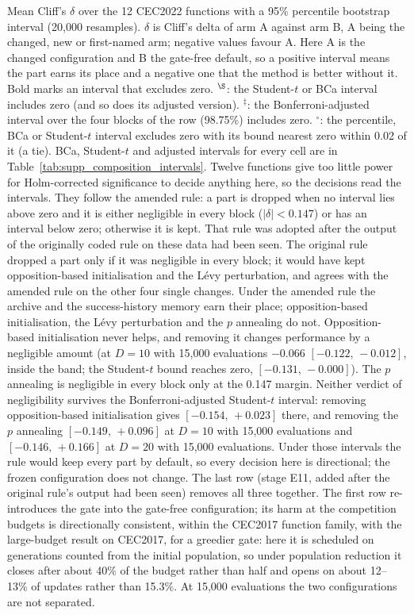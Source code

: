 \begin{table}[htbp]
\begin{flushleft}
Mean Cliff's $\delta$ over the 12 CEC2022 functions with a 95\% percentile bootstrap interval (20{,}000 resamples). $\delta$ is Cliff's delta of arm A against arm B, A being the changed, new or first-named arm; negative values favour A. Here A is the changed configuration and B the gate-free default, so a positive interval means the part earns its place and a negative one that the method is better without it. Bold marks an interval that excludes zero. $^{\S}$: the Student-$t$ or BCa interval includes zero (and so does its adjusted version). $^{\ddagger}$: the Bonferroni-adjusted interval over the four blocks of the row (98.75\%) includes zero. $^{\circ}$: the percentile, BCa or Student-$t$ interval excludes zero with its bound nearest zero within 0.02 of it (a tie). BCa, Student-$t$ and adjusted intervals for every cell are in Table~\ref{tab:supp_composition_intervals}. Twelve functions give too little power for Holm-corrected significance to decide anything here, so the decisions read the intervals. They follow the amended rule: a part is dropped when no interval lies above zero and it is either negligible in every block ($|\delta|<0.147$) or has an interval below zero; otherwise it is kept. That rule was adopted after the output of the originally coded rule on these data had been seen. The original rule dropped a part only if it was negligible in every block; it would have kept opposition-based initialisation and the L\'evy perturbation, and agrees with the amended rule on the other four single changes. Under the amended rule the archive and the success-history memory earn their place; opposition-based initialisation, the L\'evy perturbation and the $p$ annealing do not. Opposition-based initialisation never helps, and removing it changes performance by a negligible amount (at $D{=}10$ with 15{,}000 evaluations $-0.066$ $[-0.122,\,-0.012]$, inside the band; the Student-$t$ bound reaches zero, $[-0.131,\,-0.000]$). The $p$ annealing is negligible in every block only at the 0.147 margin. Neither verdict of negligibility survives the Bonferroni-adjusted Student-$t$ interval: removing opposition-based initialisation gives $[-0.154,\,+0.023]$ there, and removing the $p$ annealing $[-0.149,\,+0.096]$ at $D{=}10$ with 15{,}000 evaluations and $[-0.146,\,+0.166]$ at $D{=}20$ with 15{,}000 evaluations. Under those intervals the rule would keep every part by default, so every decision here is directional; the frozen configuration does not change. The last row (stage E11, added after the original rule's output had been seen) removes all three together. The first row re-introduces the gate into the gate-free configuration; its harm at the competition budgets is directionally consistent, within the CEC2017 function family, with the large-budget result on CEC2017, for a greedier gate: here it is scheduled on generations counted from the initial population, so under population reduction it closes after about 40\% of the budget rather than half and opens on about 12--13\% of updates rather than 15.3\%. At 15{,}000 evaluations the two configurations are not separated.
\end{flushleft}
\end{table}
